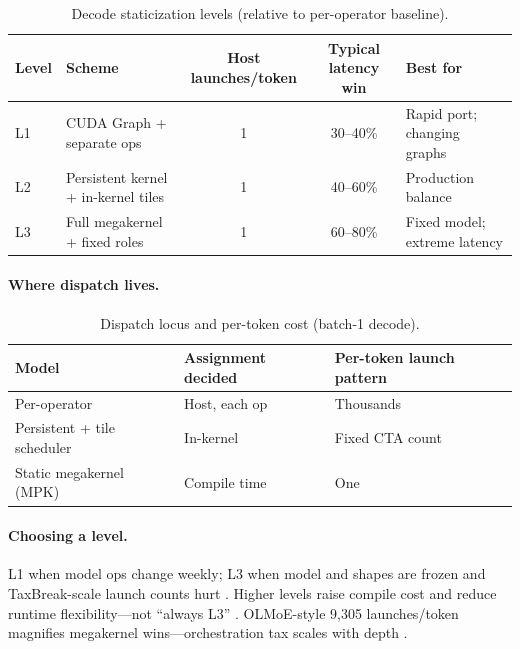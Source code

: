 \begin{table}[t]
\centering
\small
\caption{Decode staticization levels (relative to per-operator baseline).}
\label{tab:ch07_static_levels}
\begin{tabular}{@{}llccp{3.2cm}@{}}
\toprule
\textbf{Level} & \textbf{Scheme} & \textbf{Host launches/token} & \textbf{Typical latency win} & \textbf{Best for} \\
\midrule
L1 & CUDA Graph + separate ops & 1 & 30--40\% & Rapid port; changing graphs \\
L2 & Persistent kernel + in-kernel tiles & 1 & 40--60\% & Production balance \\
L3 & Full megakernel + fixed roles & 1 & 60--80\% & Fixed model; extreme latency \\
\bottomrule
\end{tabular}
\end{table}

\paragraph{Where dispatch lives.}
\label{sec:ch07_no_runtime_sched}

\begin{table}[t]
\centering
\caption{Dispatch locus and per-token cost (batch-1 decode).}
\label{tab:ch07_dispatch}
\begin{tabular}{lll}
\toprule
\textbf{Model} & \textbf{Assignment decided} & \textbf{Per-token launch pattern} \\
\midrule
Per-operator & Host, each op & Thousands \\
Persistent + tile scheduler & In-kernel & Fixed CTA count \\
Static megakernel (MPK) & Compile time & One \\
\bottomrule
\end{tabular}
\end{table}

\paragraph{Choosing a level.}
L1 when model ops change weekly; L3 when model and shapes are frozen and TaxBreak-scale launch counts hurt \citep{taxbreak2026,mpk2025}.
Higher levels raise compile cost and reduce runtime flexibility---not ``always L3'' \citep{patel2025llminference,yirage2026}.
OLMoE-style 9{,}305 launches/token magnifies megakernel wins---orchestration tax scales with depth \citep{taxbreak2026,memoryfloor2026}.


